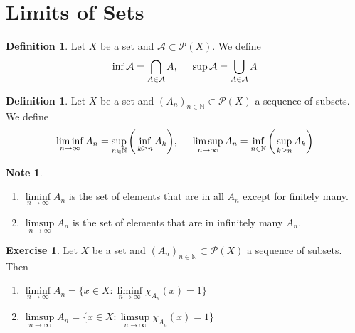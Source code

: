 \documentclass{book}
\theoremstyle{definition}
\newtheorem{defn}[definition]{Definition}
\newtheorem{note}[definition]{Note}
\newtheorem{ex}[definition]{Exercise}
\newcommand{\N}{\mathbb{N}}
\newcommand{\MA}{\mathcal{A}}
\newcommand{\MP}{\mathcal{P}}
\newcommand{\lex}[1]{\label{ex:#1}}
\newcommand{\ld}[1]{\label{defn:#1}}
\DeclareMathOperator*{\0}{\mbf{0}}
\DeclareMathOperator*{\1}{\mbf{1}}
\begin{document}
	
	
	
	
	\newpage
	\section{Limits of Sets}
	
	\begin{defn} \ld{00000} 
		Let $X$ be a set and $\MA \subset \MP(X)$. We define $$\inf \MA = \bigcap_{A \in \MA } A ,\hspace{.5cm} \sup \MA = \bigcup_{A \in \MA} A$$
		
	\end{defn}
	
	\begin{defn} \ld{00000} 
		Let $X$ be a set and $(A_n)_{n \in \N} \subset \MP(X)$ a sequence of subsets. We define
		$$\liminf_{n \rightarrow \infty} A_n = \sup_{n \in \N} \bigg( \inf_{k \geq n}A_k \bigg), \hspace{.5cm } \limsup_{n \rightarrow \infty} A_n = \inf_{n \in \N} \bigg(\sup_{k \geq n}A_k \bigg)$$
	\end{defn}
	
	\begin{note}\
		\begin{enumerate}
			\item $\liminf\limits_{n \rightarrow \infty} A_n$ is the set of elements that are in all $A_n$ except for finitely many. 
			
			\item $\limsup\limits_{n \rightarrow \infty} A_n$ is the set of elements that are in infinitely many $A_n$.
		\end{enumerate}
	\end{note}
	
	\begin{ex} \lex{00000} 
		Let $X$ be a set and $(A_n)_{n \in \N} \subset \MP(X)$ a sequence of subsets. Then 
		\begin{enumerate}
			\item $\liminf\limits_{n \rightarrow \infty}A_n = \bigg \{x \in X: \liminf\limits_{n \rightarrow \infty}\chi_{A_n}(x) = 1\bigg\}$
			\item $\limsup\limits_{n \rightarrow \infty}A_n = \bigg \{x \in X: \limsup\limits_{n \rightarrow \infty}\chi_{A_n}(x) = 1\bigg\}$
		\end{enumerate}
	\end{ex}
	
\end{document}
